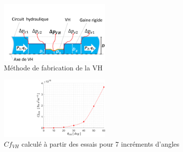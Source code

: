 \documentclass[3p,twocolumn,preprint]{elsarticle}
\begin{document}
\begin{figure}[!htb]
\begin{center}
	\captionsetup{justification=centering} 
	\includegraphics[trim={2cm 0cm 0cm 4cm},clip,width=0.49\textwidth]{figures/fabrication_tube_experimental.pdf}
	\caption{Méthode de fabrication de la VH}
	\label{fig:fabrication_tube_experimental}
\end{center}	
\end{figure}    
\begin{figure}[!htbp]
\begin{center}
	\captionsetup{justification=centering}
	\includegraphics[trim={10cm 0cm 0cm 0cm},clip,width=0.49\textwidth]{figures/resultats_essais_hydraulique_VH_D1mm.pdf}
	\caption{$Cf_{VH}$ calculé à partir des essais pour 7 incréments d'angles}
	\label{fig:resultats_essais_hydraulique_VH_D1mm}
\end{center}
\end{figure}
\end{document}
